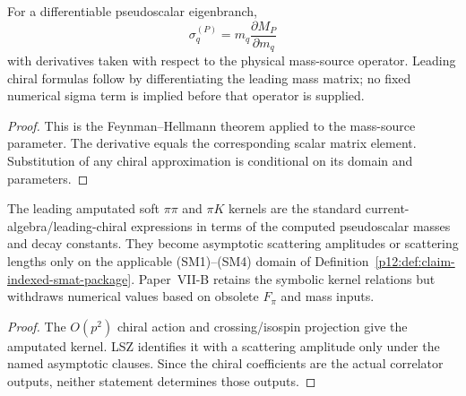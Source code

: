 \documentclass[12pt,a4paper]{article}
\begin{document}
\begin{corollary}
\label{p11:cor:goldstone-sigma-native}

For a differentiable pseudoscalar eigenbranch,
\[
\sigma_{q}^{(P)}=m_q\frac{\partial M_P}{\partial m_q}
\]
with derivatives taken with respect to the physical mass-source operator.  Leading chiral formulas follow by differentiating the leading mass matrix; no fixed numerical sigma term is implied before that operator is supplied.
\label{p11:eq:goldstone-sigma-native}
\label{p11:eq:mixed-neutral-sigma-native}
\end{corollary}
\begin{proof}

This is the Feynman--Hellmann theorem applied to the mass-source parameter.  The derivative equals the corresponding scalar matrix element.  Substitution of any chiral approximation is conditional on its domain and parameters.
\end{proof}

\begin{corollary}
\label{p11:cor:native-soft-pipi-pik-scattering}

The leading amputated soft \(\pi\pi\) and \(\pi K\) kernels are the standard
current-algebra/leading-chiral expressions in terms of the computed
pseudoscalar masses and decay constants.  They become asymptotic scattering
amplitudes or scattering lengths only on the applicable
\textnormal{(SM1)--(SM4)} domain of
Definition~\ref{p12:def:claim-indexed-smat-package}.  Paper~VII-B retains the
symbolic kernel relations but withdraws numerical values based on obsolete
\(F_\pi\) and mass inputs.
\label{p11:eq:native-pipi-scattering-lengths-numeric}
\label{p11:eq:native-pik-scattering-lengths}
\end{corollary}
\begin{proof}

The \(O(p^2)\) chiral action and crossing/isospin projection give the amputated
kernel.  LSZ identifies it with a scattering amplitude only under the named
asymptotic clauses.  Since the chiral coefficients are the actual correlator
outputs, neither statement determines those outputs.
\end{proof}
\end{document}
